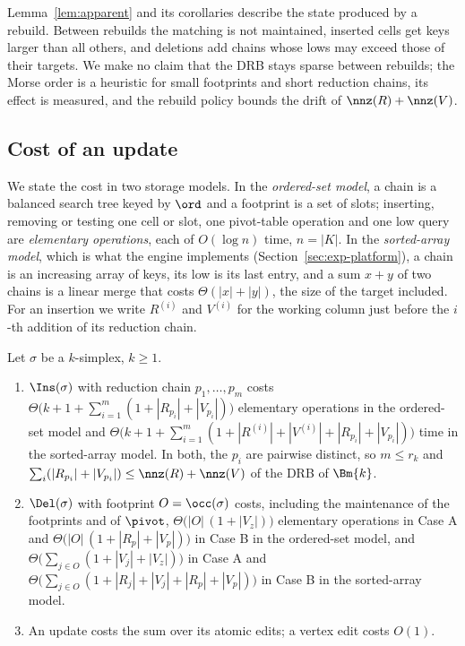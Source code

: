 \begin{remark}[Scope]\label{rem:morse-scope}
Lemma~\ref{lem:apparent} and its corollaries describe the state produced by a
rebuild. Between rebuilds the matching is not maintained, inserted cells get
keys larger than all others, and deletions add chains whose lows may exceed
those of their targets. We make no claim that the DRB stays sparse between
rebuilds; the Morse order is a heuristic for small footprints and short
reduction chains, its effect is measured, and the rebuild policy bounds the
drift of $\nnz(R)+\nnz(V)$.
\end{remark}

\subsection{Cost of an update}\label{sec:cost}

We state the cost in two storage models. In the \emph{ordered-set model}, a
chain is a balanced search tree keyed by $\ord$ and a footprint is a set of
slots; inserting, removing or testing one cell or slot, one pivot-table
operation and one low query are \emph{elementary operations}, each of
$O(\log n)$ time, $n=|K|$. In the \emph{sorted-array model}, which is what the
engine implements (Section~\ref{sec:exp-platform}), a chain is an increasing
array of keys, its low is its last entry, and a sum $x+y$ of two chains is a
linear merge that costs $\Theta(|x|+|y|)$, the size of the target included.
For an insertion we write $R^{(i)}$ and $V^{(i)}$ for the working column just
before the $i$-th addition of its reduction chain.

\begin{proposition}\label{prop:cost}
Let $\sigma$ be a $k$-simplex, $k\ge1$.
\begin{enumerate}
\item[(a)] $\Ins(\sigma)$ with reduction chain $p_1,\dots,p_m$ costs
  $\Theta\bigl(k+1+\sum_{i=1}^{m}(1+|R_{p_i}|+|V_{p_i}|)\bigr)$ elementary
  operations in the ordered-set model and
  $\Theta\bigl(k+1+\sum_{i=1}^{m}(1+|R^{(i)}|+|V^{(i)}|+|R_{p_i}|+|V_{p_i}|)\bigr)$
  time in the sorted-array model. In both, the $p_i$ are pairwise distinct, so
  $m\le r_k$ and $\sum_i(|R_{p_i}|+|V_{p_i}|)\le\nnz(R)+\nnz(V)$ of the DRB of
  $\Bm{k}$.
\item[(b)] $\Del(\sigma)$ with footprint $O=\occ(\sigma)$ costs, including the
  maintenance of the footprints and of $\pivot$,
  $\Theta\bigl(|O|\,(1+|V_z|)\bigr)$ elementary operations in Case A and
  $\Theta\bigl(|O|\,(1+|R_p|+|V_p|)\bigr)$ in Case B in the ordered-set model,
  and $\Theta\bigl(\sum_{j\in O}(1+|V_j|+|V_z|)\bigr)$ in Case A and
  $\Theta\bigl(\sum_{j\in O}(1+|R_j|+|V_j|+|R_p|+|V_p|)\bigr)$ in Case B in the
  sorted-array model.
\item[(c)] An update costs the sum over its atomic edits; a vertex edit costs
  $O(1)$.
\end{enumerate}
\end{proposition}

